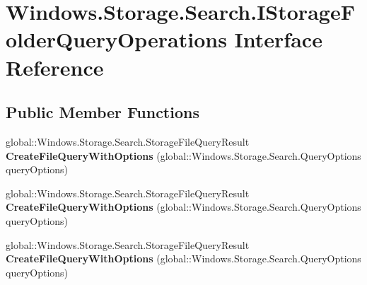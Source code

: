 \hypertarget{interface_windows_1_1_storage_1_1_search_1_1_i_storage_folder_query_operations}{}\section{Windows.\+Storage.\+Search.\+I\+Storage\+Folder\+Query\+Operations Interface Reference}
\label{interface_windows_1_1_storage_1_1_search_1_1_i_storage_folder_query_operations}
\subsection*{Public Member Functions}
\begin{DoxyCompactItemize}
\item 
\mbox{\label{interface_windows_1_1_storage_1_1_search_1_1_i_storage_folder_query_operations_aba4a49d99cc5dcfe31515c6c3c793b03}} 
global\+::\+Windows.\+Storage.\+Search.\+Storage\+File\+Query\+Result {\bfseries Create\+File\+Query\+With\+Options} (global\+::\+Windows.\+Storage.\+Search.\+Query\+Options query\+Options)
\item 
\mbox{\label{interface_windows_1_1_storage_1_1_search_1_1_i_storage_folder_query_operations_aba4a49d99cc5dcfe31515c6c3c793b03}} 
global\+::\+Windows.\+Storage.\+Search.\+Storage\+File\+Query\+Result {\bfseries Create\+File\+Query\+With\+Options} (global\+::\+Windows.\+Storage.\+Search.\+Query\+Options query\+Options)
\item 
\mbox{\label{interface_windows_1_1_storage_1_1_search_1_1_i_storage_folder_query_operations_aba4a49d99cc5dcfe31515c6c3c793b03}} 
global\+::\+Windows.\+Storage.\+Search.\+Storage\+File\+Query\+Result {\bfseries Create\+File\+Query\+With\+Options} (global\+::\+Windows.\+Storage.\+Search.\+Query\+Options query\+Options)
\item 
\mbox{\label{interface_windows_1_1_storage_1_1_search_1_1_i_storage_folder_query_operations_aba4a49d99cc5dcfe31515c6c3c793b03}} 

\end{DoxyCompactItemize}
